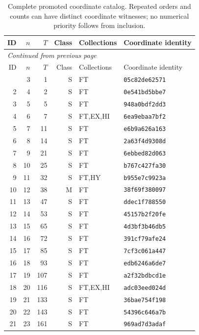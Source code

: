 \begingroup
\small
\setlength{\tabcolsep}{4pt}
\begin{longtable}{rrrrll}
\caption{Complete promoted coordinate catalog. Repeated orders and counts can have distinct coordinate witnesses; no numerical priority follows from inclusion.}\label{exp:catalog}\\
\toprule
ID & $n$ & $T$ & Class & Collections & Coordinate identity\\
\midrule
\endfirsthead
\multicolumn{6}{l}{\small\itshape Continued from previous page}\\
\toprule
ID & $n$ & $T$ & Class & Collections & Coordinate identity\\
\midrule
\endhead
\midrule
\endfoot
\bottomrule
\endlastfoot
1 & 3 & 1 & S & FT & \texttt{05c82de62571} \\
2 & 4 & 2 & S & FT & \texttt{0e541bd5bbe7} \\
3 & 5 & 5 & S & FT & \texttt{948a0bdf2dd3} \\
4 & 6 & 7 & S & FT,EX,HI & \texttt{6ea9ebaa7bf2} \\
5 & 7 & 11 & S & FT & \texttt{e6b9a626a163} \\
6 & 8 & 14 & S & FT & \texttt{2a63f4d9308d} \\
7 & 9 & 21 & S & FT & \texttt{6ebbed82d063} \\
8 & 10 & 25 & S & FT & \texttt{b767c427fa30} \\
9 & 11 & 32 & S & FT,HY & \texttt{b955e7c9923a} \\
10 & 12 & 38 & M & FT & \texttt{38f69f380097} \\
11 & 13 & 47 & S & FT & \texttt{ddec1f788550} \\
12 & 14 & 53 & S & FT & \texttt{45157b2f20fe} \\
13 & 15 & 65 & S & FT & \texttt{4d3bf3b46db5} \\
14 & 16 & 72 & S & FT & \texttt{391cf79afe24} \\
15 & 17 & 85 & S & FT & \texttt{7cf3c061a447} \\
16 & 18 & 93 & S & FT & \texttt{edb6246a6de7} \\
17 & 19 & 107 & S & FT & \texttt{a2f32bdbcd1e} \\
18 & 20 & 116 & S & FT,EX,HI & \texttt{adc03eed024d} \\
19 & 21 & 133 & S & FT & \texttt{36bae754f198} \\
20 & 22 & 143 & S & FT & \texttt{54396c646a7b} \\
21 & 23 & 161 & S & FT & \texttt{969ad7d3adaf} \\

\end{longtable}
